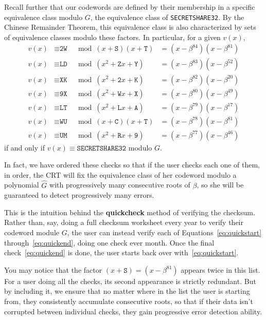 \documentclass[letterpaper]{article}
\newcommand{\vc}[1]{\texttt{#1}} %
\begin{document}
Recall further that our codewords are defined by their membership in a specific
equivalence class modulo $G$, the equivalence class of \vc{SECRETSHARE32}. By
the Chinese Remainder Theorem, this equivalence class is also characterized by
sets of equivalence classes modulo these factors. In particular, for a given $v(x)$,
\begin{align}
v(x) &\equiv \vc{2W} \label{eq:quickstart}
  &\mod (x + \vc{S})(x + \vc{T})
  &= (x - \beta^{84})(x - \beta^{81}) \\
v(x) &\equiv \vc{LD}
  &\mod (x^2 + \vc{Z}x + \vc{Y})
  &= (x - \beta^{83})(x - \beta^{52}) \\
v(x) &\equiv \vc{XK}
  &\mod (x^2 + \vc{2}x + \vc{K})
  &= (x - \beta^{82})(x - \beta^{20}) \\
v(x) &\equiv \vc{9X}
  &\mod (x^2 + \vc{W}x + \vc{X})
  &= (x - \beta^{80})(x - \beta^{49}) \\
v(x) &\equiv \vc{LT}
  &\mod (x^2 + \vc{L}x + \vc{A})
  &= (x - \beta^{79})(x - \beta^{17}) \\
v(x) &\equiv \vc{WU}
  &\mod (x + \vc{C})(x + \vc{T})
  &= (x - \beta^{78})(x - \beta^{81}) \\
v(x) &\equiv \vc{UM} \label{eq:quickend}
  &\mod (x^2 + \vc{R}x + \vc{9})
  &= (x - \beta^{77})(x - \beta^{46})
\end{align}
if and only if $v(x)\equiv\vc{SECRETSHARE32}$ modulo $G$.

In fact, we have ordered these checks so that if the user checks each one of
them, in order, the CRT will fix the equivalence class of her codeword modulo
a polynomial $\hat{G}$ with progressively many consecutive roots of $\beta$,
so she will be guaranteed to detect progressively many errors.

This is the intuition behind the \textbf{quickcheck} method of verifying the
checksum. Rather than, say, doing a full checksum worksheet every year to verify
their codeword module $G$, the user can instead verify each of
Equations~\eqref{eq:quickstart} through~\eqref{eq:quickend}, doing one check
ever month. Once the final check~\eqref{eq:quickend} is done, the user starts
back over with~\eqref{eq:quickstart}.

You may notice that the factor $(x + \vc{S}) = (x - \beta^{81})$ appears twice in
this list. For a user doing all the checks, its second appearance is strictly
redundant. But by including it, we ensure that no matter where in the list the
user is starting from, they consistently accumulate consecutive roots, so that
if their data isn't corrupted between individual checks, they gain progressive
error detection ability.
\end{document}
